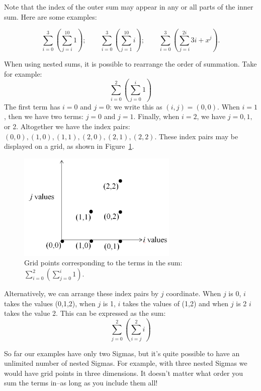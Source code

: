  Note that the index of the outer sum may appear in any or all parts of the inner sum. Here are some examples:  

\[\sum_{i=0}^{3} \left(\sum_{j=i}^{10}1\right); \qquad
\sum_{i=0}^{3} \left(\sum_{j=1}^{10}i \right); \qquad
\sum_{i=0}^{3}\left(\sum_{j=i}^{2i}3i+x^j\right).\]

When using nested sums, it is possible to rearrange the order of summation.  Take for example:
\[\sum_{i=0}^{2} \left( \sum_{j=0}^{i}1 \right)\]
The first term has $i=0$ and $j=0$: we write this as $(i,j)=(0,0)$. When $i=1$, then we have two terms:  $j=0$ and $j=1$. Finally, when $i=2$, we have $j=0,1,$ or 2.  Altogether we have the index pairs: $(0,0), (1,0), (1,1), (2,0), (2,1), (2,2)$. These index pairs may be displayed on a grid, as shown in Figure~\ref{fig:summation1}.
\begin{figure}[htb]
\begin{center}
	\includegraphics[width=3.0in]{images/i02j0igraph.png}
\caption{\label{fig:summation1} Grid points corresponding to the terms in the sum: $ \sum_{i=0}^{2} \left( \sum_{j=0}^{i}1 \right)$.}
\end{center}
\end{figure} 

Alternatively, we can arrange these index pairs by $j$ coordinate.  When $j$ is 0, $i$ takes the values (0,1,2), when $j$ is 1, $i$ takes the values of (1,2) and when $j$ is 2 $i$ takes the value 2.  This can be expressed as the sum:
\[\sum_{j=0}^{2} \left(\sum_{i=j}^{2}i \right)\]

So far our examples have only two Sigmas, but it's quite possible to have an unlimited number of nested Sigmas. For example, with three nested Sigmas we would have grid points in three dimensions.  It doesn't matter what order you sum the terms in--as long as you include them all!

